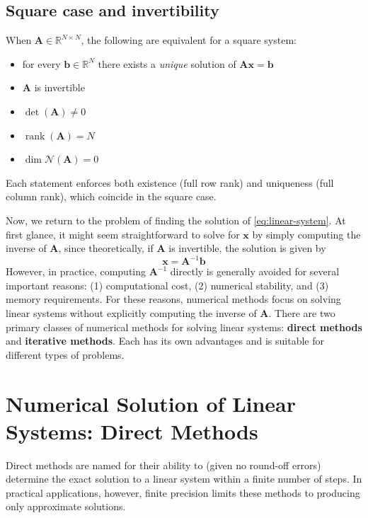 \subsection{Square case and invertibility} When $\mathbf{A}\in\mathbb{R}^{N\times N}$, the following are equivalent for a square system:
\begin{itemize}
    \item for every $\mathbf{b}\in\mathbb{R}^N$ there exists a \emph{unique} solution of $\mathbf{A}\mathbf{x}=\mathbf{b}$
    \item $\mathbf{A}$ is invertible
    \item $\det(\mathbf{A})\neq 0$
    \item $\operatorname{rank}(\mathbf{A})=N$
    \item $\dim\mathcal{N}(\mathbf{A})=0$
\end{itemize}
Each statement enforces both existence (full row rank) and uniqueness (full column rank), which coincide in the square case.

Now, we return to the problem of finding the solution of \autoref{eq:linear-system}. At first glance, it might seem straightforward to solve for $ \mathbf{x} $ by simply computing the inverse of $ \mathbf{A} $, since theoretically, if $ \mathbf{A} $ is invertible, the solution is given by
\begin{equation*}
    \mathbf{x} = \mathbf{A}^{-1}\mathbf{b}
\end{equation*}
However, in practice, computing $ \mathbf{A}^{-1} $ directly is generally avoided for several important reasons: (1) computational cost, (2) numerical stability, and (3) memory requirements. For these reasons, numerical methods focus on solving linear systems without explicitly computing the inverse of $ \mathbf{A} $. There are two primary classes of numerical methods for solving linear systems: \textbf{direct methods} and \textbf{iterative methods}. Each has its own advantages and is suitable for different types of problems.


\section{Numerical Solution of Linear Systems: Direct Methods}
Direct methods are named for their ability to (given no round-off errors) determine the exact solution to a linear system within a finite number of steps. In practical applications, however, finite precision limits these methods to producing only approximate solutions.

